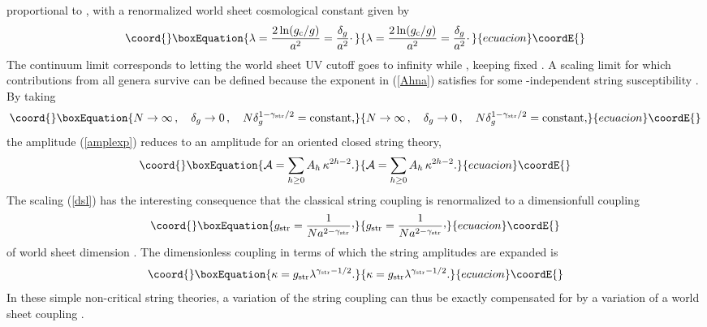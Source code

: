 \documentclass[a4paper,12pt]{article}
\def\cvp{\raise 2pt\hbox{,}}
\begin{document}
{proportional to \coordHE{}, with a renormalized world sheet
cosmological constant \myHighlight{$\lambda$}\coordHE{} given by
%
\begin{equation}\coord{}\boxEquation{
\label{wscc}
\lambda = { 2\ln (\gc /g)\over a^{2}} = {\delta_g\over a^{2}}\cdotp
}{
\lambda = { 2\ln (\gc /g)\over a^{2}} = {\delta_g\over a^{2}}\cdotp
}{ecuacion}\coordE{}\end{equation}
%
The continuum limit corresponds to letting the world sheet UV cutoff \coordHE{} 
goes to infinity while \coordHE{}, keeping fixed \myHighlight{$\lambda$}\coordHE{}.
A scaling limit for which 
contributions from all genera survive can be defined because the exponent 
\coordHE{} in (\ref{Ahna}) satisfies \coordHE{} for some \coordHE{}-independent string susceptibility \coordHE{}.
By taking
%
\begin{equation}\coord{}\boxEquation{
\label{dsl}
N\rightarrow\infty\, , \quad \delta_{g}\rightarrow 0\, ,\quad
N\delta_g^{1-\gamma_{\rm str}/2} = {\rm constant,}
}{
N\rightarrow\infty\, , \quad \delta_{g}\rightarrow 0\, ,\quad
N\delta_g^{1-\gamma_{\rm str}/2} = {\rm constant,}
}{ecuacion}\coordE{}\end{equation}
%
the amplitude (\ref{amplexp}) reduces to an amplitude for an oriented 
closed string theory,
%
\begin{equation}\coord{}\boxEquation{
\label{Aclosed}
{\cal A} = \sum_{h\geq 0} A_{h}\, \kappa^{2h-2}.
}{
{\cal A} = \sum_{h\geq 0} A_{h}\, \kappa^{2h-2}.
}{ecuacion}\coordE{}\end{equation}
%
The scaling (\ref{dsl}) has the interesting consequence that the classical 
string coupling \coordHE{} is renormalized to a dimensionfull coupling
%
\begin{equation}\coord{}\boxEquation{
\label{csc}
g_{\rm str} = {1\over N a^{2-\gamma_{\rm str}}}\cvp
}{
g_{\rm str} = {1\over N a^{2-\gamma_{\rm str}}}\cvp
}{ecuacion}\coordE{}\end{equation}
%
of world sheet dimension \coordHE{}.
The dimensionless coupling \myHighlight{$\kappa$}\coordHE{} in terms of which the string 
amplitudes are expanded is 
%
\begin{equation}\coord{}\boxEquation{
\label{kappadef2}
\kappa = g_{\rm str}\lambda^{\gamma_{\rm str}-1/2}.
}{
\kappa = g_{\rm str}\lambda^{\gamma_{\rm str}-1/2}.
}{ecuacion}\coordE{}\end{equation}
%
In these simple non-critical string theories, a variation of 
the string coupling \coordHE{} can thus be exactly compensated for by a
variation of a world sheet coupling \myHighlight{$\lambda$}\coordHE{}.

}
\end{document}
